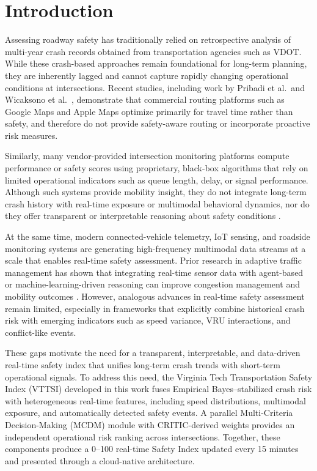 \documentclass[conference]{IEEEtran}
\begin{document}
\section{Introduction}

Assessing roadway safety has traditionally relied on retrospective analysis of
multi-year crash records obtained from transportation agencies such as VDOT. While
these crash-based approaches remain foundational for long-term planning,
they are inherently lagged and cannot capture rapidly changing operational
conditions at intersections. Recent studies, including work by Pribadi et al.\ and
Wicaksono et al.\ \cite{pribadi2022googlemapsfmea, wicaksono2022hiragooglemaps},
demonstrate that commercial routing platforms such as Google Maps and Apple Maps
optimize primarily for travel time rather than safety, and therefore do not provide
safety-aware routing or incorporate proactive risk measures.

Similarly, many vendor-provided intersection monitoring platforms compute
performance or safety scores using proprietary, black-box algorithms that rely on
limited operational indicators such as queue length, delay, or signal performance.
Although such systems provide mobility insight, they do not integrate long-term
crash history with real-time exposure or multimodal behavioral dynamics, nor do they
offer transparent or interpretable reasoning about safety conditions
\cite{schultz2025_surrogate}.

At the same time, modern connected-vehicle telemetry, IoT sensing, and roadside
monitoring systems are generating high-frequency multimodal data streams at a scale
that enables real-time safety assessment. Prior research in adaptive traffic
management has shown that integrating real-time sensor data with agent-based or
machine-learning-driven reasoning can improve congestion management and mobility
outcomes \cite{mutambik2025_iot_sensors}. However, analogous advances in real-time
safety assessment remain limited, especially in frameworks that explicitly combine
historical crash risk with emerging indicators such as speed variance, VRU
interactions, and conflict-like events.

These gaps motivate the need for a transparent, interpretable, and data-driven
real-time safety index that unifies long-term crash trends with short-term
operational signals. To address this need, the Virginia Tech Transportation Safety
Index (VTTSI) developed in this work fuses Empirical Bayes–stabilized crash risk with
heterogeneous real-time features, including speed distributions, multimodal exposure,
and automatically detected safety events. A parallel Multi-Criteria Decision-Making
(MCDM) module with CRITIC-derived weights provides an independent operational risk
ranking across intersections. Together, these components produce a 0--100 real-time
Safety Index updated every 15 minutes and presented through a cloud-native
architecture.
\end{document}

